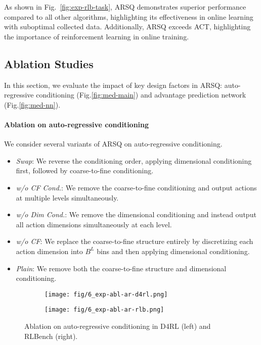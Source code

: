 As shown in Fig.~\ref{fig:exp-rlb-task}, ARSQ demonstrates superior performance compared to all other algorithms, highlighting its effectiveness in online learning with suboptimal collected data.
Additionally, ARSQ exceeds ACT, highlighting the importance of reinforcement learning in online training.

\vspace{-3mm}
\subsection{Ablation Studies}
\label{sec:exp-abl}

In this section, we evaluate the impact of key design factors in ARSQ: auto-regressive conditioning (Fig.\ref{fig:med-main}) and advantage prediction network (Fig.\ref{fig:med-nn}).

\paragraph{Ablation on auto-regressive conditioning}
We consider several variants of ARSQ on auto-regressive conditioning.
\vspace{-2mm}
\begin{itemize}\setlength{\itemsep}{0pt}
    \item \textit{Swap}: We reverse the conditioning order, applying dimensional conditioning first, followed by coarse-to-fine conditioning.
    \item \textit{w/o CF Cond.}: We remove the coarse-to-fine conditioning and output actions at multiple levels simultaneously.
    \item \textit{w/o Dim Cond.}: We remove the dimensional conditioning and instead output all action dimensions simultaneously at each level.
    \item \textit{w/o CF}: We replace the coarse-to-fine structure entirely by discretizing each action dimension into  $B^L$  bins and then applying dimensional conditioning.
    \item \textit{Plain}: We remove both the coarse-to-fine structure and dimensional conditioning.
\end{itemize}

\begin{figure}[ht]
    \vspace{-1em}
    \centering
    \begin{subfigure}[t]{0.22\textwidth}
        \centering
        \texttt{[image: fig/6\_exp-abl-ar-d4rl.png]}
        \label{fig:exp-abl-ar-d4rl}
    \end{subfigure}
    \hspace{0.01\textwidth}
    \begin{subfigure}[t]{0.22\textwidth}
        \centering
        \texttt{[image: fig/6\_exp-abl-ar-rlb.png]}
        \label{fig:exp-abl-ar-rlb}
    \end{subfigure}
    \vspace{-1em}
    \caption{Ablation on auto-regressive conditioning in D4RL (left) and RLBench (right).}
    \label{fig:exp-abl-ar}
\end{figure}

